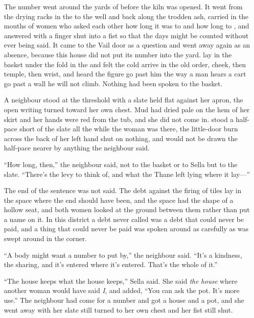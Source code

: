 
The number went around the yards of  before the kiln was opened. It went from the drying racks in the  to the well and back along the trodden ash, carried in the mouths of women who asked each other how long it was to  and how long to , and answered with a finger shut into a fist so that the days might be counted without ever being said. It came to the Vail door as a question and went away again as an absence, because this house did not put its number into the yard.  lay in the basket under the fold in the  and felt the cold arrive in the old order, cheek, then temple, then wrist, and heard the figure go past him the way a man hears a cart go past a wall he will not climb. Nothing had been spoken to the basket.

A neighbour stood at the threshold with a slate held flat against her apron, the open writing turned toward her own chest. Mud had dried pale on the hem of her skirt and her hands were red from the tub, and she did not come in.  stood a half-pace short of the slate all the while the woman was there, the little-door burn across the back of her left hand shut on nothing, and would not be drawn the half-pace nearer by anything the neighbour said.

“How long, then,” the neighbour said, not to the basket or to Sella but to the slate. “There's the levy to think of, and what the Thane left lying where it lay---”

The end of the sentence was not said. The debt against the firing of tiles lay in the space where the end should have been, and the space had the shape of a hollow seat, and both women looked at the ground between them rather than put a name on it. In this district a debt never called was a debt that could never be paid, and a thing that could never be paid was spoken around as carefully as  was swept around in the corner.

“A body might want a number to put by,” the neighbour said. “It's a kindness, the sharing, and it's entered where it's entered. That's the whole of it.”

“The house keeps what the house keeps,” Sella said. She said \emph{the house} where another woman would have said \emph{I}, and added, “You can ask the pot. It's more use.” The neighbour had come for a number and got a house and a pot, and she went away with her slate still turned to her own chest and her fist still shut.

